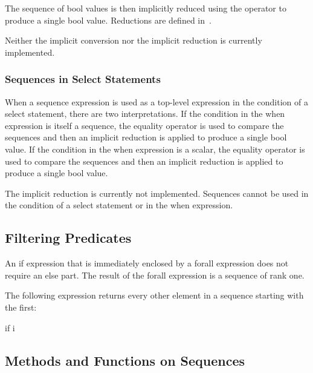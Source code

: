 The sequence of bool values is then implicitly reduced using
the \chpl{&&} operator to produce a single bool value.  Reductions are
defined in~.

\begin{implementation}
Neither the implicit conversion nor the implicit reduction is
currently implemented.
\end{implementation}

\subsubsection{Sequences in Select Statements}
\label{Sequences_in_Select_Statements}

When a sequence expression is used as a top-level expression in the
condition of a select statement, there are two interpretations.  If
the condition in the when expression is itself a sequence, the
equality operator is used to compare the sequences and then an
implicit \chpl{&&} reduction is applied to produce a single bool
value.  If the condition in the when expression is a scalar, the
equality operator is used to compare the sequences and then an
implicit \chpl{||} reduction is applied to produce a single bool
value.

\begin{implementation}
The implicit reduction is currently not implemented.  Sequences cannot
be used in the condition of a select statement or in the when
expression.
\end{implementation}

\subsection{Filtering Predicates}
\label{Filtering_Predicates}

An if expression that is immediately enclosed by a forall expression
does not require an else part.  The result of the forall expression is
a sequence of rank one.
\begin{example}
The following expression returns every other element in a sequence
starting with the first:
\begin{chapel}
[i in 1..s.length] if i %
\end{chapel}
\end{example}

\subsection{Methods and Functions on Sequences}
\label{Methods_and_Functions_on_Sequences}


